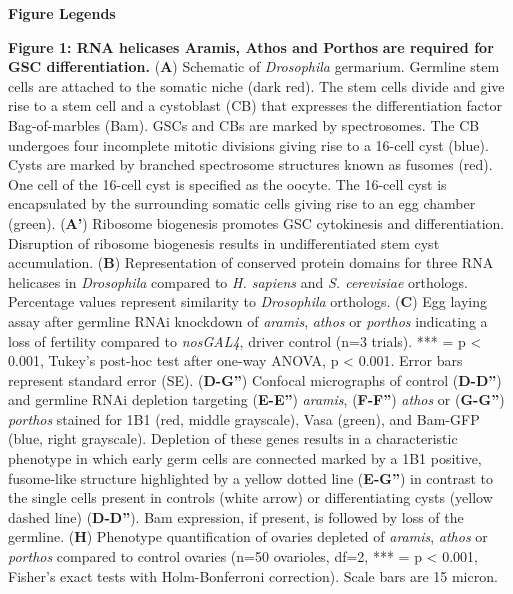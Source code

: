 \documentclass[12pt,twoside]{reedthesis}
\begin{document}
\textbf{Figure Legends}

\textbf{Figure 1: RNA helicases Aramis, Athos and Porthos} \textbf{are required for
GSC differentiation.} (\textbf{A}) Schematic of \emph{Drosophila} germarium.
Germline stem cells are attached to the somatic niche (dark red). The
stem cells divide and give rise to a stem cell and a cystoblast (CB)
that expresses the differentiation factor Bag-of-marbles (Bam). GSCs and
CBs are marked by spectrosomes. The CB undergoes four incomplete mitotic
divisions giving rise to a 16-cell cyst (blue). Cysts are marked by
branched spectrosome structures known as fusomes (red). One cell of the
16-cell cyst is specified as the oocyte. The 16-cell cyst is
encapsulated by the surrounding somatic cells giving rise to an egg
chamber (green). (\textbf{A'}) Ribosome biogenesis promotes GSC cytokinesis
and differentiation. Disruption of ribosome biogenesis results in
undifferentiated stem cyst accumulation. (\textbf{B}) Representation of
conserved protein domains for three RNA helicases in \emph{Drosophila}
compared to \emph{H. sapiens} and \emph{S. cerevisiae} orthologs. Percentage
values represent similarity to \emph{Drosophila} orthologs. (\textbf{C}) Egg
laying assay after germline RNAi knockdown of \emph{aramis}, \emph{athos} or
\emph{porthos} indicating a loss of fertility compared to \emph{nosGAL4}, driver
control (n=3 trials). *** = p \textless{} 0.001, Tukey's post-hoc test after
one-way ANOVA, p \textless{} 0.001. Error bars represent standard error (SE).
(\textbf{D-G''}) Confocal micrographs of control (\textbf{D-D''}) and germline
RNAi depletion targeting (\textbf{E-E''}) \emph{aramis}, (\textbf{F-F''}) \emph{athos} or
(\textbf{G-G''}) \emph{porthos} stained for 1B1 (red, middle grayscale), Vasa
(green), and Bam-GFP (blue, right grayscale). Depletion of these genes
results in a characteristic phenotype in which early germ cells are
connected marked by a 1B1 positive, fusome-like structure highlighted by
a yellow dotted line (\textbf{E-G''}) in contrast to the single cells present
in controls (white arrow) or differentiating cysts (yellow dashed line)
(\textbf{D-D''}). Bam expression, if present, is followed by loss of the
germline. (\textbf{H}) Phenotype quantification of ovaries depleted of
\emph{aramis}, \emph{athos} or \emph{porthos} compared to control ovaries (n=50
ovarioles, df=2, *** = p \textless{} 0.001, Fisher's exact tests with
Holm-Bonferroni correction). Scale bars are 15 micron.
\end{document}
